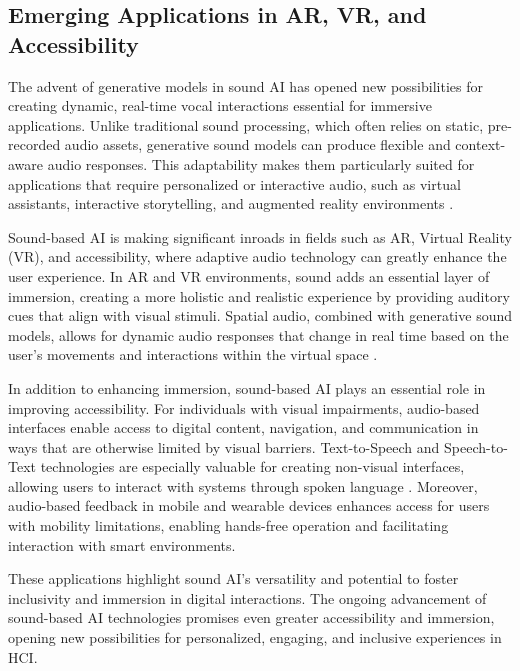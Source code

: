 \subsection{Emerging Applications in AR, VR, and Accessibility}

The advent of generative models in sound AI has opened new possibilities for creating dynamic, real-time vocal interactions essential for immersive applications. Unlike traditional sound processing, which often relies on static, pre-recorded audio assets, generative sound models can produce flexible and context-aware audio responses. This adaptability makes them particularly suited for applications that require personalized or interactive audio, such as virtual assistants, interactive storytelling, and augmented reality environments \cite{1386017}\cite{van2016wavenet}.

Sound-based AI is making significant inroads in fields such as AR, Virtual Reality (VR), and accessibility, where adaptive audio technology can greatly enhance the user experience. In AR and VR environments, sound adds an essential layer of immersion, creating a more holistic and realistic experience by providing auditory cues that align with visual stimuli. Spatial audio, combined with generative sound models, allows for dynamic audio responses that change in real time based on the user’s movements and interactions within the virtual space \cite{su2024sonifyar}.

In addition to enhancing immersion, sound-based AI plays an essential role in improving accessibility. For individuals with visual impairments, audio-based interfaces enable access to digital content, navigation, and communication in ways that are otherwise limited by visual barriers. Text-to-Speech and Speech-to-Text technologies are especially valuable for creating non-visual interfaces, allowing users to interact with systems through spoken language \cite{wald2005enhancing}. Moreover, audio-based feedback in mobile and wearable devices enhances access for users with mobility limitations, enabling hands-free operation and facilitating interaction with smart environments.

These applications highlight sound AI’s versatility and potential to foster inclusivity and immersion in digital interactions. The ongoing advancement of sound-based AI technologies promises even greater accessibility and immersion, opening new possibilities for personalized, engaging, and inclusive experiences in HCI.


